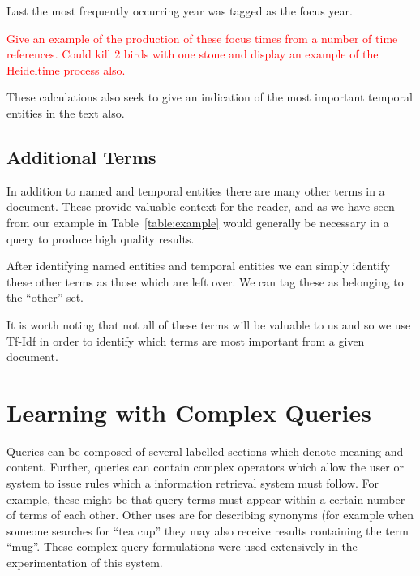 \documentclass{mpaper}
\newcommand{\remove}[1]{\textcolor{red}{#1}}
\begin{document}
Last the most frequently occurring year was tagged as the focus year.

\remove{Give an example of the production of these focus times from a number of time references. Could kill 2 birds with one stone and display an example of the Heideltime process also.}

These calculations also seek to give an indication of the most important temporal entities in the text also.
 
\subsection{Additional Terms}
In addition to named and temporal entities there are many other terms in a document. These provide valuable context for the reader, and as we have seen from our example in Table~\ref{table:example} would generally be necessary in a query to produce high quality results.

After identifying named entities and temporal entities we can simply identify these other terms as those which are left over. We can tag these as belonging to the ``other'' set.

It is worth noting that not all of these terms will be valuable to us and so we use Tf-Idf in order to identify which terms are most important from a given document.

\section{Learning with Complex Queries} \label{sec:l2r}



Queries can be composed of several labelled sections which denote meaning and content. 
Further, queries can contain complex operators which allow the user or system to issue rules which a information retrieval system must follow. For example, these might be that query terms must appear within a certain number of terms of each other.
Other uses are for describing synonyms (for example when someone searches for ``tea cup'' they may also receive results containing the term ``mug''.
These complex query formulations were used extensively in the experimentation of this system.
\end{document}
